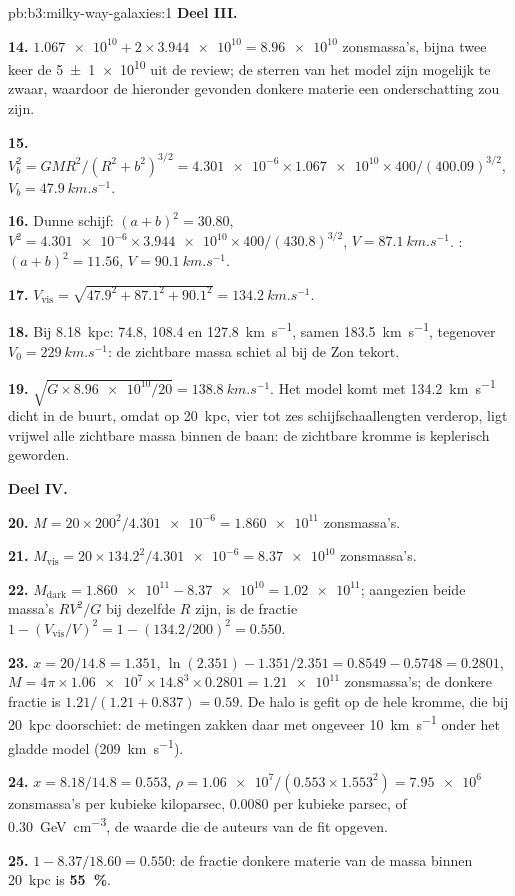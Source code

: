 \begin{solution}{pb:b3:milky-way-galaxies:1}
\textbf{Deel III.}

\textbf{14.} $\num{1.067e10} + 2\times\num{3.944e10} = \num{8.96e10}$ zonsmassa's,
bijna twee keer de \num[separate-uncertainty=true]{5 \pm 1 e10} uit de review; de sterren van het model
zijn mogelijk te zwaar, waardoor de hieronder gevonden donkere materie
een onderschatting zou zijn.

\textbf{15.} $V_b^2 = GMR^2/(R^2 + b^2)^{3/2} = \num{4.301e-6}\times\num{1.067e10}
\times400/(400.09)^{3/2}$, $V_b = \qty{47.9}{km.s^{-1}}$.

\textbf{16.} Dunne schijf: $(a + b)^2 = 30.80$, $V^2 = \num{4.301e-6}\times\num{3.944e10}
\times400/(430.8)^{3/2}$, $V = \qty{87.1}{km.s^{-1}}$. :
$(a + b)^2 = 11.56$, $V = \qty{90.1}{km.s^{-1}}$.

\textbf{17.} $V_\mathrm{vis} = \sqrt{47.9^2 + 87.1^2 + 90.1^2} =
\qty{134.2}{km.s^{-1}}$.

\textbf{18.} Bij \qty{8.18}{kpc}: 74.8, 108.4 en \qty{127.8}{km.s^{-1}},
samen \qty{183.5}{km.s^{-1}}, tegenover $V_0 = \qty{229}{km.s^{-1}}$:
de zichtbare massa schiet al bij de Zon tekort.

\textbf{19.} $\sqrt{G\times\num{8.96e10}/20} = \qty{138.8}{km.s^{-1}}$. Het
model komt met \qty{134.2}{km.s^{-1}} dicht in de buurt, omdat op \qty{20}{kpc},
vier tot zes schijfschaallengten verderop, ligt vrijwel alle zichtbare massa
binnen de baan: de zichtbare kromme is keplerisch geworden.

\textbf{Deel IV.}

\textbf{20.} $M = 20\times200^2/\num{4.301e-6} = \num{1.860e11}$ zonsmassa's.

\textbf{21.} $M_\mathrm{vis} = 20\times134.2^2/\num{4.301e-6} = \num{8.37e10}$
zonsmassa's.

\textbf{22.} $M_\mathrm{dark} = \num{1.860e11} - \num{8.37e10} = \num{1.02e11}$;
aangezien beide massa's $RV^2/G$ bij dezelfde $R$ zijn, is de fractie
$1 - (V_\mathrm{vis}/V)^2 = 1 - (134.2/200)^2 = \num{0.550}$.

\textbf{23.} $x = 20/14.8 = 1.351$, $\ln(2.351) - 1.351/2.351 = 0.8549 - 0.5748
= 0.2801$, $M = 4\pi\times\num{1.06e7}\times14.8^3\times0.2801 =
\num{1.21e11}$ zonsmassa's; de donkere fractie is
$1.21/(1.21 + 0.837) = \num{0.59}$. De halo is gefit op de hele
kromme, die bij \qty{20}{kpc} doorschiet: de metingen zakken daar
met ongeveer \qty{10}{km.s^{-1}} onder het gladde model (\qty{209}{km.s^{-1}}).

\textbf{24.} $x = 8.18/14.8 = 0.553$, $\rho = \num{1.06e7}/(0.553\times1.553^2)
= \num{7.95e6}$ zonsmassa's per kubieke kiloparsec, \num{0.0080} per
kubieke parsec, of \qty{0.30}{GeV.cm^{-3}}, de waarde die de auteurs van de
fit opgeven.

\textbf{25.} $1 - 8.37/18.60 = \num{0.550}$: de fractie donkere materie van de
massa binnen \qty{20}{kpc} is
\textbf{\qty[text-series-to-math=true]{55}{\percent}}.
\end{solution}
